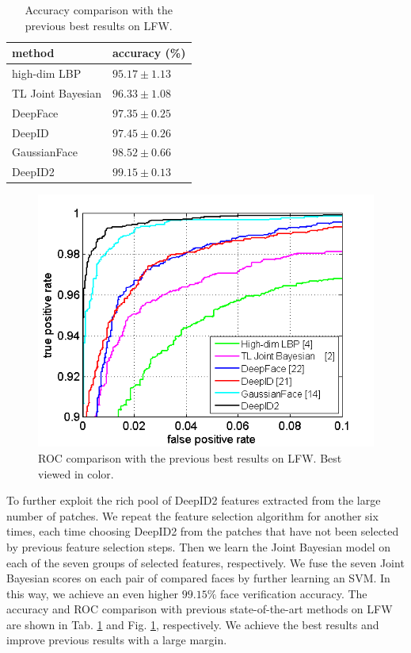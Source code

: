 \documentclass{article} %
\begin{document}
\begin{table}[t]
\caption{Accuracy comparison with the previous best results on LFW.}
\label{tab:compare}
\vspace{-0.0in}
\begin{center}
\begin{tabular}{p{100pt}|p{100pt}}
\toprule
method & accuracy (\%) \\
\midrule
high-dim LBP \cite{chen2013} & $95.17\pm1.13$ \\
TL Joint Bayesian \cite{cao2013} & $96.33\pm1.08$ \\
DeepFace \cite{taigman2014} & $97.35\pm0.25$ \\
DeepID \cite{sun2014} & $97.45\pm0.26$ \\
GaussianFace \cite{lu2014} & $98.52\pm0.66$ \\
DeepID2 & $99.15\pm0.13$ \\
\bottomrule
\end{tabular}
\end{center}
\vspace{-0.17in}
\end{table}

\begin{figure}[!h]
\begin{center}
\includegraphics[width = 0.6\linewidth]{picture/Picture8.png}
\end{center}
\vspace{-0.2in}
\caption{ROC comparison with the previous best results on LFW. Best viewed in color.}
\label{fig:compare}
\vspace{-0.1in}
\end{figure}

To further exploit the rich pool of DeepID2 features extracted from the large number of patches. We repeat the feature selection algorithm for another six times, each time choosing DeepID2 from the patches that have not been selected by previous feature selection steps. Then we learn the Joint Bayesian model on each of the seven groups of selected features, respectively.
We fuse the seven Joint Bayesian scores on each pair of compared faces by further learning an SVM. In this way, we achieve an even higher $\bm{99.15\%}$ face verification accuracy.
The accuracy and ROC comparison with previous state-of-the-art methods on LFW are shown in Tab. \ref{tab:compare} and Fig. \ref{fig:compare}, respectively. We achieve the best results and improve previous results with a large margin.
\end{document}
